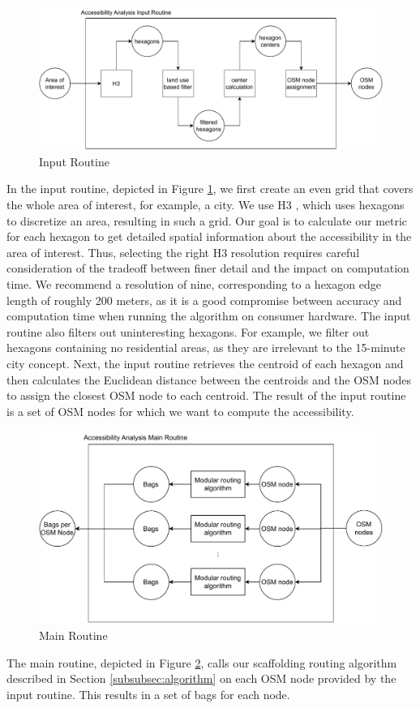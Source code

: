 \begin{figure}
    \centering
    \includegraphics[scale=0.50]{Figures/method/input_routine}
    \caption{Input Routine}
    \label{fig:input_routine}
\end{figure}
In the input routine, depicted in Figure \ref{fig:input_routine}, we first create an even grid that covers the whole area of interest, for example, a city.
We use H3 , which uses hexagons to discretize an area, resulting in such a grid.
Our goal is to calculate our metric for each hexagon to get detailed spatial information about the accessibility in the area of interest.
Thus, selecting the right H3 resolution requires careful consideration of the tradeoff between finer detail and the impact on computation time.
We recommend a resolution of nine, corresponding to a hexagon edge length of roughly 200 meters, as it is a good compromise between accuracy and computation time when running the algorithm on consumer hardware. 
The input routine also filters out uninteresting hexagons.
For example, we filter out hexagons containing no residential areas, as they are irrelevant to the 15-minute city concept.
Next, the input routine retrieves the centroid of each hexagon and then calculates the Euclidean distance between the centroids and the OSM nodes to assign the closest OSM node to each centroid.
The result of the input routine is a set of OSM nodes for which we want to compute the accessibility.


\begin{figure}
    \centering
    \includegraphics[scale=0.50]{Figures/method/main_routine}
    \caption{Main Routine}
    \label{fig:main_routine}
\end{figure}
The main routine, depicted in Figure \ref{fig:main_routine}, calls our scaffolding routing algorithm described in Section \ref{subsubsec:algorithm} on each OSM node provided by the input routine.
This results in a set of bags for each node.

